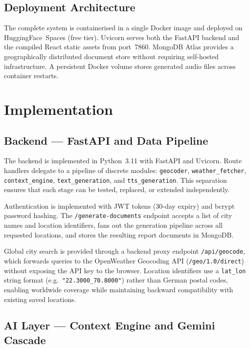 \documentclass[11pt, a4paper]{article}
\begin{document}
\subsection{Deployment Architecture}

The complete system is containerised in a single Docker image and deployed on
HuggingFace~Spaces (free tier). Uvicorn serves both the FastAPI backend and the compiled
React static assets from port~7860. MongoDB Atlas provides a geographically distributed
document store without requiring self-hosted infrastructure. A persistent Docker volume
stores generated audio files across container restarts.

\section{Implementation}

\subsection{Backend — FastAPI and Data Pipeline}

The backend is implemented in Python~3.11 with FastAPI and Uvicorn. Route handlers delegate
to a pipeline of discrete modules: \texttt{geocoder}, \texttt{weather\_fetcher},
\texttt{context\_engine}, \texttt{text\_generation}, and \texttt{tts\_generation}.
This separation ensures that each stage can be tested, replaced, or extended independently.

Authentication is implemented with JWT tokens (30-day expiry) and bcrypt password hashing.
The \texttt{/generate-documents} endpoint accepts a list of city names and location
identifiers, fans out the generation pipeline across all requested locations, and stores
the resulting report documents in MongoDB.

Global city search is provided through a backend proxy endpoint \texttt{/api/geocode},
which forwards queries to the OpenWeather Geocoding API (\texttt{/geo/1.0/direct}) without
exposing the API key to the browser. Location identifiers use a \texttt{lat\_lon} string
format (e.g.\ \texttt{"22.3000\_70.8000"}) rather than German postal codes, enabling
worldwide coverage while maintaining backward compatibility with existing saved locations.

\subsection{AI Layer — Context Engine and Gemini Cascade}
\end{document}
